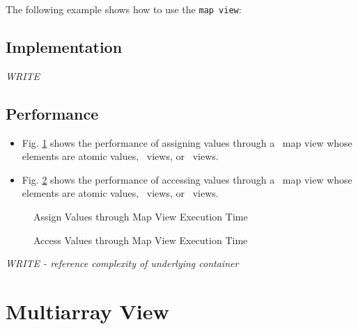 The following example shows how to use the \texttt{map view}:


\subsection{Implementation} \label{sec-map-vw-impl}

\textit{WRITE}

\subsection{Performance} \label{sec-map-vw-perf}

\begin{itemize}
\item
Fig. \ref{fig:map-vw-assign-exper}
shows the performance of assigning values through a \stapl\ map view
whose elements are atomic values, \stl\ views, or \stapl\ views.
\item
Fig. \ref{fig:map-vw-access-exper}
shows the performance of accessing values through a \stapl\ map view
whose elements are atomic values, \stl\ views, or \stapl\ views.
\end{itemize}

\begin{figure}[p]
\caption{Assign Values through Map View Execution Time}
\label{fig:map-vw-assign-exper}
\end{figure}

\begin{figure}[p]
\caption{Access Values through Map View Execution Time}
\label{fig:map-vw-access-exper}
\end{figure}

\emph{WRITE - reference complexity of underlying container}


\section{Multiarray View} \label{sec-multi-vw}

